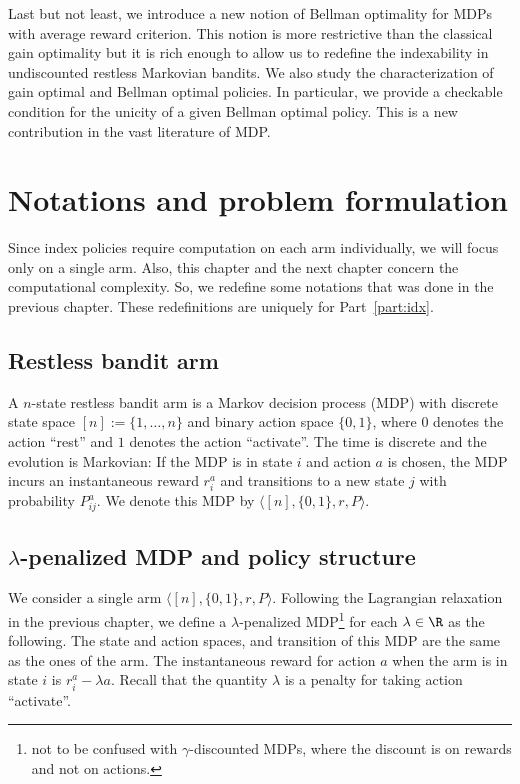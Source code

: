 Last but not least, we introduce a new notion of Bellman optimality for MDPs with average reward criterion. This notion is more restrictive than the classical gain optimality but it is rich enough to allow us to redefine the indexability in undiscounted restless Markovian bandits. We also study the characterization of gain optimal and Bellman optimal policies. In particular, we provide a checkable condition for the unicity of a given Bellman optimal policy. This is a new contribution in the vast literature of MDP.

\section{Notations and problem formulation}
\label{ch:idx:sec:notation}

Since index policies require computation on each arm individually, we will focus only on a single arm.
Also, this chapter and the next chapter concern the computational complexity.
So, we redefine some notations that was done in the previous chapter.
These redefinitions are uniquely for Part~\ref{part:idx}.

\subsection{Restless bandit arm}

A $n$-state restless bandit arm is a Markov decision process (MDP) with discrete state space $[n]:=\{1,\dots, n\}$ and binary action space $\{0, 1\}$, where $0$ denotes the action ``rest'' and $1$ denotes the action ``activate''. The time is discrete and the evolution is Markovian: If the MDP is in state $i$ and action $a$ is chosen, the MDP incurs an instantaneous reward ${r}^a_i$ and transitions to a new state $j$ with probability ${P}^a_{ij}$. We denote this MDP by $\langle[n],\{0,1\},r,P\rangle$.

\subsection{\texorpdfstring{$\lambda$-p}{P}enalized MDP and policy structure}
\label{ch:idx:sec:penal_mdp}

We consider a single arm $\langle[n],\{0,1\},r,P\rangle$.
Following the Lagrangian relaxation in the previous chapter, we define a $\lambda$-penalized MDP\footnote{not to be confused with $\gamma$-discounted MDPs, where the discount is on rewards and not on actions.} for each $\lambda\in\R$ as the following.
The state and action spaces, and transition of this MDP are the same as the ones of the arm.
The instantaneous reward for action $a$ when the arm is in state $i$ is $r^a_i-\lambda a$.
Recall that the quantity $\lambda$ is a penalty for taking action ``activate''.

